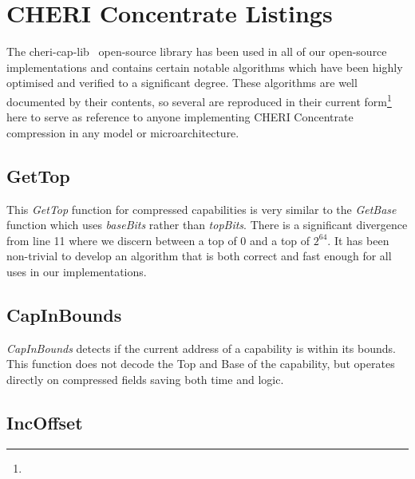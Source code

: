 \chapter{CHERI Concentrate Listings}
\label{app:cheri-128-listings}

The cheri-cap-lib~\cite{CHERI-cheri-cap-lib} open-source library has been used in all of our open-source~\cite{CHERI-cheri-cpu,CHERI-Piccolo,CHERI-Flute,CHERI-Toooba} implementations and contains certain notable algorithms which have been highly optimised and verified to a significant degree.
These algorithms are well documented by their contents, so several are reproduced in their current form\footnote{} here to serve as reference to anyone implementing CHERI Concentrate compression in any model or microarchitecture.

\section{GetTop}
\label{sec:cheri-128-listings-gettop}

This \emph{GetTop} function for compressed capabilities is very similar to the \emph{GetBase} function which uses \emph{baseBits} rather than \emph{topBits}.
There is a significant divergence from line 11 where we discern between a top of 0 and a top of $2^{64}$.
It has been non-trivial to develop an algorithm that is both correct and fast enough for all uses in our implementations.



\section{CapInBounds}
\label{sec:cheri-128-listings-capinbounds}

\emph{CapInBounds} detects if the current address of a capability is within its bounds.
This function does not decode the Top and Base of the capability,
but operates directly on compressed fields saving both time and logic.



\section{IncOffset}
\label{sec:cheri-128-listings-incoffset}


